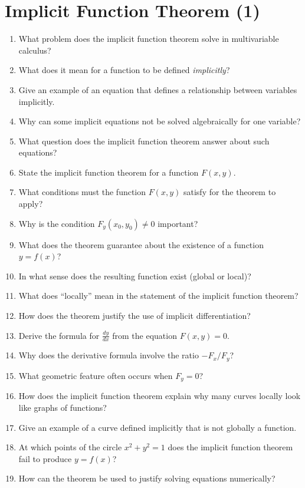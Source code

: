 \section{Implicit Function Theorem (1)}

\begin{enumerate}
  \item What problem does the implicit function theorem solve in multivariable calculus?
  \item What does it mean for a function to be defined \emph{implicitly}?
  \item Give an example of an equation that defines a relationship between variables implicitly.
  \item Why can some implicit equations not be solved algebraically for one variable?
  \item What question does the implicit function theorem answer about such equations?
  \item State the implicit function theorem for a function \(F(x,y)\).
  \item What conditions must the function \(F(x,y)\) satisfy for the theorem to apply?
  \item Why is the condition \(F_y(x_0,y_0) \neq 0\) important?
  \item What does the theorem guarantee about the existence of a function \(y=f(x)\)?
  \item In what sense does the resulting function exist (global or local)?
  \item What does ``locally'' mean in the statement of the implicit function theorem?
  \item How does the theorem justify the use of implicit differentiation?
  \item Derive the formula for \(\frac{dy}{dx}\) from the equation \(F(x,y)=0\).
  \item Why does the derivative formula involve the ratio \(-F_x/F_y\)?
  \item What geometric feature often occurs when \(F_y=0\)?
  \item How does the implicit function theorem explain why many curves locally look like graphs of functions?
  \item Give an example of a curve defined implicitly that is not globally a function.
  \item At which points of the circle \(x^2+y^2=1\) does the implicit function theorem fail to produce \(y=f(x)\)?
  \item How can the theorem be used to justify solving equations numerically?

\end{enumerate}
